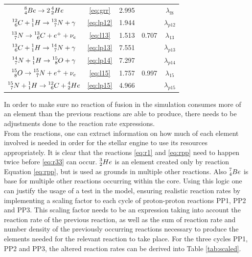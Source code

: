 \documentclass[10pt, nofootinbib, twocolumn]{revtex4-1}
\begin{document}
\begin{table}[H]
\begin{tabular*}{0.5\textwidth}{@{\extracolsep{\fill}}ccccc}
     $\prescript{8}{4}Be \rightarrow 2\prescript{4}{2}He$& \eqref{eq:grr} &2.995& &$\lambda_{l8}$\\
     $\prescript{12}{6}C+\prescript{1}{1}H\rightarrow\prescript{13}{7}N+\gamma$& \eqref{eq:lp12} &1.944& &$\lambda_{p12}$\\
     $\prescript{13}{7}N \rightarrow \prescript{13}{6}C+e^++\nu_e$& \eqref{eq:l13} &1.513&0.707 &$\lambda_{13}$\\
     $\prescript{13}{6}C + \prescript{1}{1}H\rightarrow \prescript{14}{7}N+\gamma$& \eqref{eq:lp13} &7.551& &$\lambda_{p13}$\\
     $\prescript{14}{7}N + \prescript{1}{1}H\rightarrow \prescript{15}{8}O+\gamma$& \eqref{eq:lp14} &7.297& &$\lambda_{p14}$\\
     $\prescript{15}{8}O \rightarrow \prescript{15}{7}N +e^++\nu_e$& \eqref{eq:l15} &1.757& 0.997&$\lambda_{15}$\\
     $\prescript{15}{7}N + \prescript{1}{1}H\rightarrow \prescript{12}{6}C + \prescript{4}{2}He$& \eqref{eq:lp15} &4.966& &$\lambda_{p15}$  
    \label{tab:en}
    \end{tabular*}
\end{table}

In order to make sure no reaction of fusion in the simulation consumes more of an element than the previous reactions are able to produce, there needs to be adjustments done to the reaction rate expressions. \\

From the reactions, one can extract information on how much of each element involved is needed in order for the stellar engine to use its resources appropriately. It is clear that the reactions \eqref{eq:r1} and \eqref{eq:rpp} need to happen twice before \eqref{eq:r33} can occur. $\prescript{3}{2}He$ is an element created only by reaction Equation \eqref{eq:rpp}, but is used as grounds in multiple other reactions. Also $\prescript{7}{4}Be$ is base for multiple other reactions occurring within the core. Using this logic one can justify the usage of a test in the model, ensuring realistic reaction rates by implementing a scaling factor to each cycle of proton-proton reactions PP1, PP2 and PP3. This scaling factor needs to be an expression taking into account the reaction rate of the previous reaction, as well as the sum of reaction rate and number density of the previously occurring reactions necessary to produce the elements needed for the relevant reaction to take place. For the three cycles PP1, PP2 and PP3, the altered reaction rates can be derived into Table \ref{tab:scaled}. 
\end{document}

